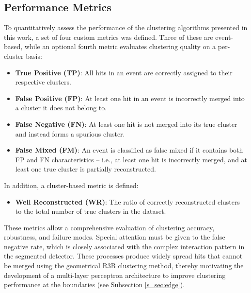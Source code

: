 \documentclass[review,sort&compress]{elsarticle}
\begin{document}
\subsection{Performance Metrics}\label{s_sec:metrics}
To quantitatively assess the performance of the clustering algorithms presented in this work, a set of four custom metrics was defined. Three of these are event-based, while an optional fourth metric evaluates clustering quality on a per-cluster basis:
\begin{itemize}
    \item \textbf{True Positive (TP)}: All hits in an event are correctly assigned to their respective clusters.
    \item \textbf{False Positive (FP)}: At least one hit in an event is incorrectly merged into a cluster it does not belong to.
    \item \textbf{False Negative (FN)}: At least one hit is not merged into its true cluster and instead forms a spurious cluster.
    \item \textbf{False Mixed (FM)}: An event is classified as false mixed if it contains both FP and FN characteristics -- i.e., at least one hit is incorrectly merged, and at least one true cluster is partially reconstructed.
\end{itemize}
In addition, a cluster-based metric is defined:
\begin{itemize}
    \item \textbf{Well Reconstructed (WR)}: The ratio of correctly reconstructed clusters to the total number of true clusters in the dataset.
\end{itemize}
These metrics allow a comprehensive evaluation of clustering accuracy, robustness, and failure modes.\newline
Special attention must be given to the false negative rate, which is closely associated with the complex interaction pattern in the segmented detector. These processes produce widely spread hits that cannot be merged using the geometrical R3B clustering method, thereby motivating the development of a multi-layer perceptron architecture to improve clustering performance at the boundaries (see Subsection \ref{s_sec:edge}).\newline
\end{document}
